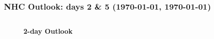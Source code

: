 \documentclass[aspectratio=169, 10pt]{beamer}
\begin{document}
\begin{frame}
\vspace{-1cm}
\frametitle{NHC Outlook: days 2 \& 5 ({\AdvanceDate[+2]\today}, {\AdvanceDate[+5]\today})}

\vspace{-.3cm}
\begin{columns}
\begin{column}{0.5\textwidth}


\begin{figure}
\textbf{2-day Outlook} \\
\end{figure}

\end{column}
\begin{column}{0.5\textwidth}


\end{column}
\end{columns}
\end{frame}
\end{document}
